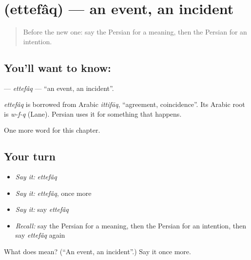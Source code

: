 \section[\texorpdfstring{\fa{اتفاق} (ettefâq)}{اتفاق (ettefâq)}]{ (ettefâq) — an event, an incident}

\label{lesson:FA-C160-ettefaq}



\begin{quote}
Before the new one: say the Persian for a meaning, then the Persian for an intention.
\end{quote}

\subsection*{You'll want to know: }
\textbf{} — \emph{ettefâq} — \textquotedblleft{}an event, an incident\textquotedblright{}.

\begin{cousinweb}
\emph{ettefâq} is borrowed from Arabic \emph{ittifāq}, \textquotedblleft{}agreement, coincidence\textquotedblright{}. Its Arabic root is \emph{w-f-q} (Lane). Persian uses it for something that happens.
\end{cousinweb}

\begin{grammarlens}[title={What you've built}]
One more word for this chapter.
\end{grammarlens}

\subsection*{Your turn}
\begin{itemize}
\raggedright
  \item \emph{Say it:} \emph{ettefâq}
  \item \emph{Say it:} \emph{ettefâq}, once more
  \item \emph{Say it:} say \emph{ettefâq}
  \item \emph{Recall:} say the Persian for a meaning, then the Persian for an intention, then say \emph{ettefâq} again
\end{itemize}

\begin{tcolorbox}[breakable,colback=teal!4,colframe=teal!35!black,title={Before you move on}]
What does  mean? (\textquotedblleft{}An event, an incident\textquotedblright{}.) Say it once more.
\end{tcolorbox}
